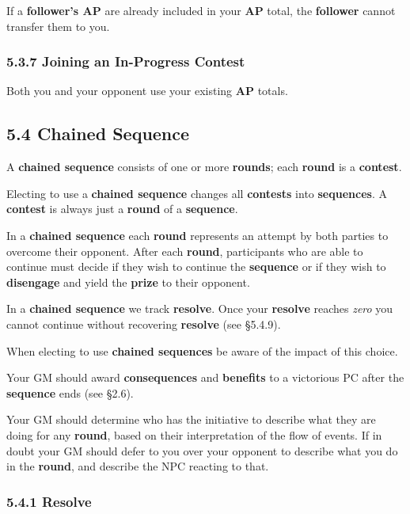 \documentclass[
  11pt,
]{article}
\begin{document}
If a \textbf{follower's AP} are already included in your \textbf{AP}
total, the \textbf{follower} cannot transfer them to you.

\hypertarget{joining-an-in-progress-contest-2}{%
\subsubsection{5.3.7 Joining an In-Progress
Contest}\label{joining-an-in-progress-contest-2}}

Both you and your opponent use your existing \textbf{AP} totals.

\hypertarget{chained-sequence}{%
\subsection{5.4 Chained Sequence}\label{chained-sequence}}

A \textbf{chained sequence} consists of one or more \textbf{rounds};
each \textbf{round} is a \textbf{contest}.

Electing to use a \textbf{chained sequence} changes all
\textbf{contests} into \textbf{sequences}. A \textbf{contest} is always
just a \textbf{round} of a \textbf{sequence}.

In a \textbf{chained sequence} each \textbf{round} represents an attempt
by both parties to overcome their opponent. After each \textbf{round},
participants who are able to continue must decide if they wish to
continue the \textbf{sequence} or if they wish to \textbf{disengage} and
yield the \textbf{prize} to their opponent.

In a \textbf{chained sequence} we track \textbf{resolve}. Once your
\textbf{resolve} reaches \emph{zero} you cannot continue without
recovering \textbf{resolve} (see §5.4.9).

When electing to use \textbf{chained sequences} be aware of the impact
of this choice.

Your GM should award \textbf{consequences} and \textbf{benefits} to a
victorious PC after the \textbf{sequence} ends (see §2.6).

Your GM should determine who has the initiative to describe what they
are doing for any \textbf{round}, based on their interpretation of the
flow of events. If in doubt your GM should defer to you over your
opponent to describe what you do in the \textbf{round}, and describe the
NPC reacting to that.

\hypertarget{resolve}{%
\subsubsection{5.4.1 Resolve}\label{resolve}}
\end{document}
